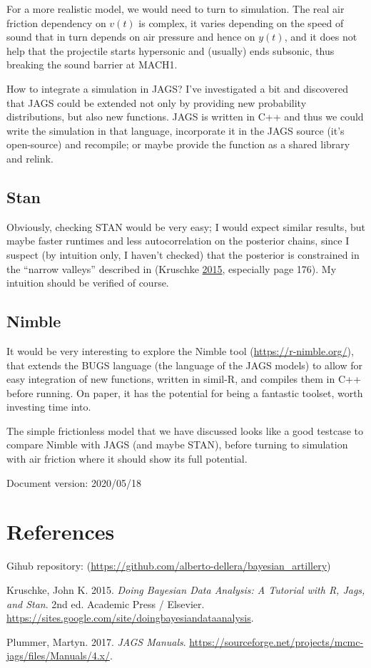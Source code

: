 \documentclass[]{article}
\begin{document}
For a more realistic model, we would need to turn to simulation. The
real air friction dependency on \(v(t)\) is complex, it varies depending
on the speed of sound that in turn depends on air pressure and hence on
\(y(t)\), and it does not help that the projectile starts hypersonic and
(usually) ends subsonic, thus breaking the sound barrier at MACH1.

How to integrate a simulation in JAGS? I've investigated a bit and
discovered that JAGS could be extended not only by providing new
probability distributions, but also new functions. JAGS is written in
C++ and thus we could write the simulation in that language, incorporate
it in the JAGS source (it's open-source) and recompile; or maybe provide
the function as a shared library and relink.

\hypertarget{stan}{%
\subsection{Stan}\label{stan}}

Obviously, checking STAN would be very easy; I would expect similar
results, but maybe faster runtimes and less autocorrelation on the
posterior chains, since I suspect (by intuition only, I haven't checked)
that the posterior is constrained in the ``narrow valleys'' described in
(Kruschke \protect\hyperlink{ref-DBDA2E}{2015}, especially page 176). My
intuition should be verified of course.

\hypertarget{nimble}{%
\subsection{Nimble}\label{nimble}}

It would be very interesting to explore the Nimble tool
(\url{https://r-nimble.org/}), that extends the BUGS language (the
language of the JAGS models) to allow for easy integration of new
functions, written in simil-R, and compiles them in C++ before running.
On paper, it has the potential for being a fantastic toolset, worth
investing time into.

The simple frictionless model that we have discussed looks like a good
testcase to compare Nimble with JAGS (and maybe STAN), before turning to
simulation with air friction where it should show its full potential.

Document version: 2020/05/18

\hypertarget{references}{%
\section{References}\label{references}}

Gihub repository:
(\url{https://github.com/alberto-dellera/bayesian_artillery})

\hypertarget{refs}{}
\leavevmode\hypertarget{ref-DBDA2E}{}%
Kruschke, John K. 2015. \emph{Doing Bayesian Data Analysis: A Tutorial
with R, Jags, and Stan}. 2nd ed. Academic Press / Elsevier.
\url{https://sites.google.com/site/doingbayesiandataanalysis}.

\leavevmode\hypertarget{ref-JAGSmanual}{}%
Plummer, Martyn. 2017. \emph{JAGS Manuals}.
\url{https://sourceforge.net/projects/mcmc-jags/files/Manuals/4.x/}.
\end{document}
